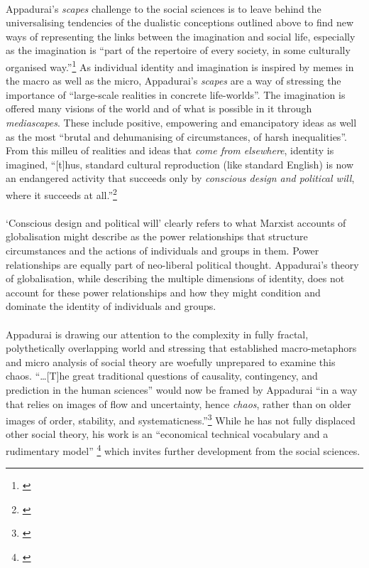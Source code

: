 \documentclass{article}
\begin{document}
\paragraph{}Appadurai's \emph{scapes} challenge to the social sciences is to leave behind the universalising tendencies of the dualistic conceptions outlined above to find new ways of representing the links between the imagination and social life, especially as the imagination is ``part of the repertoire of every society, in some culturally organised way.''\footnote{\cite[p. 53]{Appadurai:1996lp}} As individual identity and imagination is inspired by memes in the macro as well as the micro, Appadurai's \emph{scapes} are a way of stressing the importance of ``large-scale realities in concrete life-worlds''. The imagination is offered many visions of the world and of what is possible in it through \emph{mediascapes}. These include positive, empowering and emancipatory ideas as well as the most ``brutal and dehumanising of circumstances, of harsh inequalities''. From this milleu of realities and ideas that \emph{come from elsewhere}, identity is imagined, ``[t]hus, standard cultural reproduction (like standard English) is now an endangered activity that succeeds only by \emph{conscious design and political will}, where it succeeds at all.''\footnote{\cite[p.53-55, emphasis added]{Appadurai:1996lp}}

\paragraph{}`Conscious design and political will' clearly refers to what Marxist accounts of globalisation might describe as the power relationships that structure circumstances and the actions of individuals and groups in them. Power relationships are equally part of neo-liberal political thought. Appadurai's theory of globalisation, while describing the multiple dimensions of identity, does not account for these power relationships and how they might condition and dominate the identity of individuals and groups.

\paragraph{}Appadurai is drawing our attention to the complexity in fully fractal, polythetically overlapping world and stressing that established macro-metaphors and micro analysis of social theory are woefully unprepared to examine this chaos. ``\ldots [T]he great traditional questions of causality, contingency, and prediction in the human sciences'' would now be framed by Appadurai ``in a way that relies on images of flow and uncertainty, hence \emph{chaos}, rather than on older images of order, stability, and systematicness.''\footnote{\cite[p.46-47, original emphasis]{Appadurai:1996lp}} While he has not fully displaced other social theory, his work is an ``economical technical vocabulary and a rudimentary model'' \footnote{\cite[p.47]{Appadurai:1996lp}} which invites further development from the social sciences.

\newpage
\singlespacing

\end{document}

